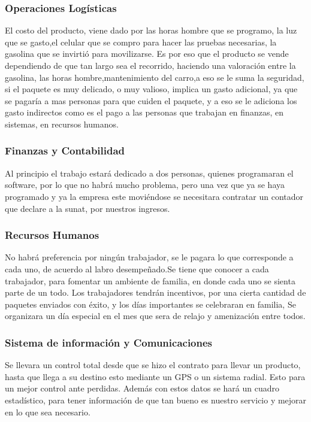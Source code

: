 \subsubsection{Operaciones Logísticas}
El costo del producto, viene dado por las horas hombre que se programo, la luz que se gasto,el celular que se compro para hacer las pruebas necesarias, la gasolina que se invirtió para movilizarse. Es por eso que el producto se vende dependiendo de que tan largo sea el recorrido, haciendo una valoración entre la gasolina, las horas hombre,mantenimiento del carro,a eso se le suma la seguridad, si el paquete es muy delicado, o muy valioso, implica un gasto adicional, ya que se pagaría a mas personas para que cuiden el paquete, y a eso se le adiciona los gasto indirectos como es el pago a las personas que trabajan en finanzas, en sistemas, en recursos humanos.

\subsubsection{Finanzas y Contabilidad}
Al principio el trabajo estará dedicado a dos personas, quienes programaran el software, por lo que no habrá mucho problema, pero una vez que ya se haya programado  y ya la empresa este moviéndose se necesitara contratar un contador que declare a la sunat, por nuestros ingresos.

\subsubsection{Recursos Humanos}
No habrá preferencia por ningún trabajador, se le pagara lo que corresponde a cada uno, de acuerdo al labro desempeñado.Se tiene que conocer a cada trabajador, para fomentar un ambiente de familia, en donde cada uno se sienta parte de un todo. Los trabajadores tendrán incentivos, por una cierta cantidad de paquetes enviados con éxito, y los días importantes se celebraran en familia, Se organizara un día especial en el mes que sera de relajo y amenización entre todos. 

\subsubsection{Sistema de información y Comunicaciones}
Se llevara un control total desde que se hizo el contrato para llevar un producto, hasta que llega a su destino esto mediante un GPS o un sistema radial. Esto para un mejor control ante perdidas. Además con estos datos se hará un cuadro estadístico, para tener información de que tan bueno es nuestro servicio y mejorar en lo que sea necesario.

